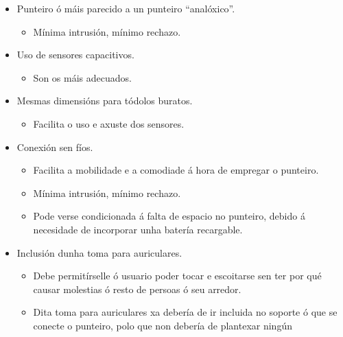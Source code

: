 \begin{itemize}
\begin{itemize}
\begin{itemize}
\begin{itemize}
                       \end{itemize}
                 \item Punteiro ó máis parecido a un punteiro ``analóxico''.
                       \begin{itemize}
                        \item Mínima intrusión, mínimo rechazo.
                       \end{itemize}
                 \item Uso de sensores capacitivos.
                       \begin{itemize}
                        \item Son os máis adecuados.
                       \end{itemize}
                 \item Mesmas dimensións para tódolos buratos.
                       \begin{itemize}
                        \item Facilita o uso e axuste dos sensores.
                       \end{itemize}
                 \item Conexión sen fíos.
                       \begin{itemize}
                        \item Facilita a mobilidade e a comodiade á hora de
                              empregar o punteiro.
                        \item Mínima intrusión, mínimo rechazo.
                        \item Pode verse condicionada á falta de espacio no
                              punteiro, debido á necesidade de incorporar unha
                              batería recargable.
                       \end{itemize}
                 \item Inclusión dunha toma para auriculares.
                       \begin{itemize}
                        \item Debe permitírselle ó usuario poder tocar e
                              escoitarse sen ter por qué causar molestias ó
                              resto de persoas ó seu arredor.
                        \item Dita toma para auriculares xa debería de ir
                              incluida no soporte ó que se conecte o punteiro,
                              polo que non debería de plantexar ningún

\end{itemize}
\end{itemize}
\end{itemize}
\end{itemize}
